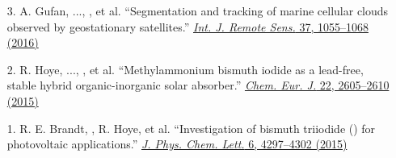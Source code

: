 \begin{enumerate}
        \item[3.] A. Gufan, ..., \myname, et al. ``Segmentation and tracking of marine cellular clouds observed by geostationary satellites.'' \href{https://www.tandfonline.com/doi/full/10.1080/2150704X.2016.1142681?cookieSet=1}{\textit{Int. J. Remote Sens.} 37, 1055--1068 (2016)}

        \item[2.] R. Hoye, ..., \myname, et al. ``Methylammonium bismuth iodide as a lead-free, stable hybrid organic-inorganic solar absorber.'' \href{http://doi.wiley.com/10.1002/chem.201505055}{\textit{Chem. Eur. J.} 22, 2605--2610 (2015)}

        \item[1.] R. E. Brandt, \myname, R. Hoye, et al. ``Investigation of bismuth triiodide () for photovoltaic applications.'' \href{https://pubs.acs.org/doi/full/10.1021/acs.jpclett.5b02022}{\textit{J. Phys. Chem. Lett.} 6, 4297--4302 (2015)}
\end{enumerate}



